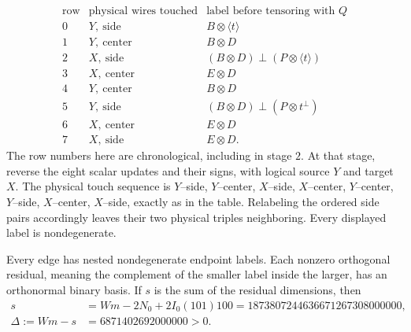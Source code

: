 \begin{equation}\label{net:labels}
\begin{array}{c|l|l}
 \text{row}&\text{physical wires touched}&
                 \text{label before tensoring with }Q\\\hline
 0&Y,\ \text{side}& B\otimes\langle t\rangle\\
 1&Y,\ \text{center}& B\otimes D\\
 2&X,\ \text{side}&(B\otimes D)\mathbin\perp(P\otimes\langle t\rangle)\\
 3&X,\ \text{center}&E\otimes D\\
 4&Y,\ \text{center}&B\otimes D\\
 5&Y,\ \text{side}&(B\otimes D)\mathbin\perp(P\otimes t^\perp)\\
 6&X,\ \text{center}&E\otimes D\\
 7&X,\ \text{side}&E\otimes D.
\end{array}
\end{equation}
The row numbers here are chronological, including in stage $2$.
At that stage, reverse the eight scalar updates and their signs, with
logical source $Y$ and target $X$.  The physical touch sequence is
$Y$--side, $Y$--center, $X$--side, $X$--center, $Y$--center,
$Y$--side, $X$--center, $X$--side, exactly as in the table.
Relabeling the ordered side pairs accordingly leaves their two
physical triples neighboring.  Every displayed label is nondegenerate.

\begin{lemma}\label{net:residuals}
Every edge has nested nondegenerate endpoint labels.  Each nonzero
orthogonal residual, meaning the complement of the smaller label
inside the larger, has an orthonormal binary basis.  If $s$ is the
sum of the residual dimensions, then
\begin{align}
 s&=Wm-2N_0+2I_0(101)100
   =1873807244636671267308000000,\label{net:s}\\
 \Delta:=Wm-s&=6871402692000000>0.\label{net:delta}
\end{align}
\end{lemma}

